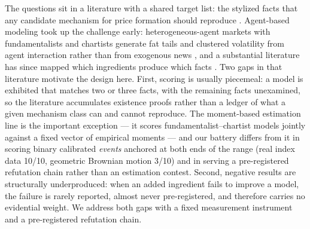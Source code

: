 \documentclass[11pt]{article}
\begin{document}
The questions sit in a literature with a shared target list: the stylized
facts that any candidate mechanism for price formation should reproduce
\citep{cont2001}. Agent-based modeling took up the challenge early:
heterogeneous-agent markets with fundamentalists and chartists generate fat
tails and clustered volatility from agent interaction rather than from
exogenous news \citep{lux1999}, and a substantial literature has since
mapped which ingredients produce which facts \citep{lebaron2006}. Two gaps
in that literature motivate the design here. First, scoring is usually
piecemeal: a model is exhibited that matches two or three facts, with the
remaining facts unexamined, so the literature accumulates existence proofs
rather than a ledger of what a given mechanism class can and cannot
reproduce. The moment-based estimation line is the important exception
--- it scores fundamentalist--chartist models jointly against a fixed
vector of empirical moments \citep{winker2007, franke2012} --- and our
battery differs from it in scoring binary calibrated \emph{events}
anchored at both ends of the range (real index data 10/10, geometric
Brownian motion 3/10) and in serving a pre-registered refutation chain
rather than an estimation contest. Second, negative results are structurally underproduced: when an
added ingredient fails to improve a model, the failure is rarely reported,
almost never pre-registered, and therefore carries no evidential weight. We
address both gaps with a fixed measurement instrument and a pre-registered
refutation chain.
\end{document}
